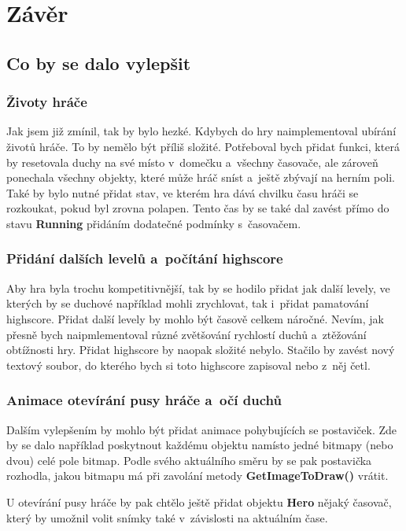 \documentclass[a4]{article}
\begin{document}
\section{Závěr}
\subsection{Co by se dalo vylepšit}
\subsubsection{Životy hráče}
Jak jsem již zmínil, tak by bylo hezké. Kdybych do hry naimplementoval ubírání životů hráče. To by nemělo být příliš složité. Potřeboval bych přidat funkci, která by resetovala duchy na své místo v~domečku a~všechny časovače, ale zároveň ponechala všechny objekty, které může hráč sníst a~ještě zbývají na herním poli. Také by bylo nutné přidat stav, ve kterém hra dává chvilku času hráči se rozkoukat, pokud byl zrovna polapen. Tento čas by se také dal zavést přímo do stavu \textbf{Running} přidáním dodatečné podmínky s~časovačem.

\subsubsection{Přidání dalších levelů a~počítání highscore}
Aby hra byla trochu kompetitivnější, tak by se hodilo přidat jak další levely, ve kterých by se duchové například mohli zrychlovat, tak i~přidat pamatování highscore. Přidat další levely by mohlo být časově celkem náročné. Nevím, jak přesně bych naipmlementoval různé zvětšování rychlostí duchů a~ztěžování obtížnosti hry. Přidat highscore by naopak složité nebylo. Stačilo by zavést nový textový soubor, do kterého bych si toto highscore zapisoval nebo z~něj četl.

\subsubsection{Animace otevírání pusy hráče a~očí duchů}
Dalším vylepšením by mohlo být přidat animace pohybujících se postaviček. Zde by se dalo například poskytnout každému objektu namísto jedné bitmapy (nebo dvou) celé pole bitmap. Podle svého aktuálního směru by se pak postavička rozhodla, jakou bitmapu má při zavolání metody \textbf{GetImageToDraw()} vrátit.

U otevírání pusy hráče by pak chtělo ještě přidat objektu \textbf{Hero} nějaký časovač, který by umožnil volit snímky také v~závislosti na aktuálním čase.
\end{document}
